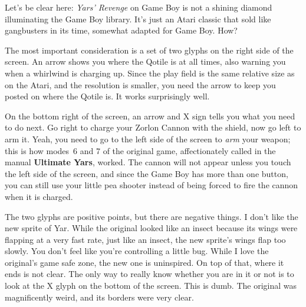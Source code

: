 \documentclass{book}
\begin{document}
Let’s be clear here: \emph{Yars’ Revenge} on Game Boy is not a shining diamond illuminating the Game Boy library. It’s just an Atari classic that sold like gangbusters in its time, somewhat adapted for Game Boy. How?\par
\FloatBarrier\vspace{\baselineskip}\centering
\begin{minipage}{0.45\linewidth}\end{minipage}\vspace{2pt}
\begin{minipage}{0.45\linewidth}\end{minipage}
\par\justifying
The most important consideration is a set of two glyphs on the right side of the screen. An arrow shows you where the Qotile is at all times, also warning you when a whirlwind is charging up. Since the play field is the same relative size as on the Atari, and the resolution is smaller, you need the arrow to keep you posted on where the Qotile is. It works surprisingly well.\par
On the bottom right of the screen, an arrow and X sign tells you what you need to do next. Go right to charge your Zorlon Cannon with the shield, now go left to arm it. Yeah, you need to go to the left side of the screen to \emph{arm} your weapon; this is how modes~6 and 7 of the original game, affectionately called in the manual \textbf{Ultimate Yars}, worked. The cannon will not appear unless you touch the left side of the screen, and since the Game Boy has more than one button, you can still use your little pea shooter instead of being forced to fire the cannon when it is charged.\par
The two glyphs are positive points, but there are negative things. I don’t like the new sprite of Yar. While the original looked like an insect because its wings were flapping at a very fast rate, just like an insect, the new sprite’s wings flap too slowly. You don’t feel like you’re controlling a little bug. While I love the original’s game safe zone, the new one is uninspired. On top of that, where it ends is not clear. The only way to really know whether you are in it or not is to look at the X glyph on the bottom of the screen. This is dumb. The original was magnificently weird, and its borders were very clear.\par
\end{document}

